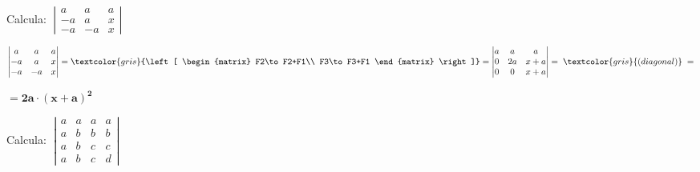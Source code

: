 

\begin{ejre}
	Calcula: $\; \left| \begin{matrix} a&a&a\\-a&a&x\\ -a&-a&x  \end{matrix} \right| $
\end{ejre}

\begin{proofw}\renewcommand{\qedsymbol}{$\diamond$}
	$\left| \begin{matrix} a&a&a\\-a&a&x\\ -a&-a&x  \end{matrix} \right|=
	\textcolor{gris}{\left[ \begin{matrix} F2\to F2+F1\\ F3\to F3+F1  \end{matrix}  \right]}=\left| \begin{matrix} a&a&a\\0&2a&x+a\\ 0&0&x+a  \end{matrix} \right|= \; \textcolor{gris}{( diagonal )} \; =$
	
\noindent 	$=\boldsymbol{ 2a\cdot(x+a)^2 } $
\end{proofw}

\begin{ejre}
Calcula: 	$\; \left| \begin{matrix}  a&a&a&a\\a&b&b&b\\a&b&c&c\\a&b&c&d \end{matrix} \right|$
\end{ejre}

